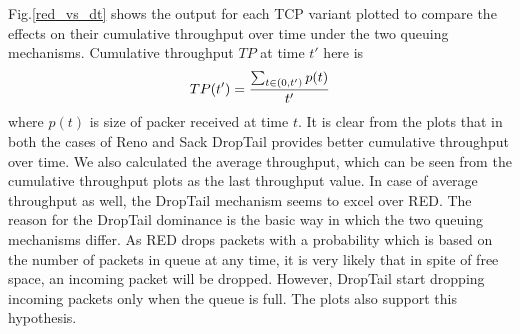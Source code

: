 \documentclass[USenglish,oneside,twocolumn]{article}
\begin{document}
Fig.\ref{red_vs_dt} shows the output for each TCP variant plotted to compare the effects on their cumulative throughput over time under the two queuing mechanisms. Cumulative throughput $TP$ at time $t'$ here is $$TP(t') = {\sum_{t \in (0,t')}p(t) \over t'}$$ where $p(t)$ is size of packer received at time $t$. It is clear from the plots that in both the cases of Reno and Sack DropTail provides better cumulative throughput over time. We also calculated the average throughput, which can be seen from the cumulative throughput plots as the last throughput value. In case of average throughput as well, the DropTail mechanism seems to excel over RED. The reason for the DropTail dominance is the basic way in which the two queuing mechanisms differ. As RED drops packets with a probability which is based on the number of packets in queue at any time, it is very likely that in spite of free space, an incoming packet will be dropped. However, DropTail start dropping incoming packets only when the queue is full. The plots also support this hypothesis. 
\end{document}
